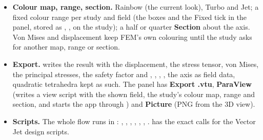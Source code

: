 \begin{itemize}[nosep]
        , ,  with the axis, and recomputed only when it changes. The
        panel has Radial, Hoop, Axial and Shear buttons next to Stress, Displacement and Safety Factor, a ``Pick axis''
        button (selected circular edge or cylindrical face) and a ``Spin axis'' button to go back; the ribbon has a Hoop
        Stress command.
  \item \textbf{Colour map, range, section.} Rainbow (the current look), Turbo and Jet; a fixed colour range per study and
        field (the boxes and the Fixed tick in the panel, stored as , ,
         on the study); a half or quarter \textbf{Section} about the axis. Von Mises and displacement
        keep FEM's own colouring until the study asks for another map, range or section.
  \item \textbf{Export.}  writes the result with the displacement, the stress tensor, von Mises, the
        principal stresses, the safety factor and , , , , the axis as field
        data, quadratic tetrahedra kept as such. The panel has \textbf{Export .vtu}, \textbf{ParaView} (writes a view script
        with the shown field, the study's colour map, range and section, and starts the app through
        ) and \textbf{Picture} (PNG from the 3D view).
  \item \textbf{Scripts.} The whole flow runs in : , , ,
        , , , .  has the
        exact calls for the Vector Jet design scripts.
\end{itemize}

